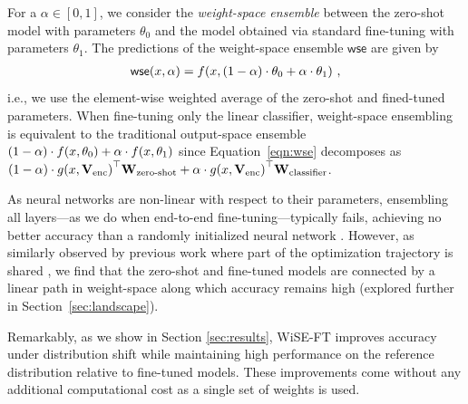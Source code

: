 For a \textit{\ALPHA{}}  $\alpha \in [0,1]$, we consider the \textit{weight-space ensemble} between the zero-shot model with parameters $\theta_0$ and the model obtained via standard fine-tuning with parameters $\theta_1$. 
The predictions of the weight-space ensemble $\mathsf{wse}$ are given by
\begin{align}\label{eqn:wse}
    \mathsf{wse}(x, \alpha) = f\mleft(x, (1-\alpha)\cdot\theta_0 + \alpha\cdot\theta_1 \mright)\ ,
\end{align}
i.e., we use the element-wise weighted average of the zero-shot and fined-tuned parameters. 
When fine-tuning only the linear classifier, weight-space ensembling is equivalent to the traditional output-space ensemble \cite{dietterich2000ensemble, breiman1996bagging, FREUND1997119} $(1-\alpha)\cdot f\mleft(x, \theta_0\mright)  + \alpha\cdot f\mleft(x, \theta_1 \mright)$ since Equation~\ref{eqn:wse} decomposes as $(1-\alpha)\cdot g\mleft(x, \mathbf{V}_{\text{enc}}\mright)^\top \textbf{W}_{\text{zero-shot}} + \alpha \cdot g\mleft(x, \mathbf{V}_{\text{enc}}\mright)^\top \textbf{W}_{\text{classifier}}$.
 
 As neural networks are non-linear with respect
 to their parameters, ensembling all layers---as we do when end-to-end fine-tuning---typically fails, achieving no better accuracy than a randomly initialized neural network \cite{frankle2020linear}. However, as similarly observed by previous work where part of the optimization trajectory is shared \cite{izmailov2018averaging,frankle2020linear, neyshabur2020being}, we find that the zero-shot and fine-tuned models are connected by a linear path in weight-space along which accuracy remains high (explored further in Section~\ref{sec:landscape}).

Remarkably, as we show in Section \ref{sec:results},  WiSE-FT improves accuracy under distribution shift while maintaining high performance on the reference distribution relative to fine-tuned models. 
These improvements come without any additional computational cost as a single set of weights is used.






